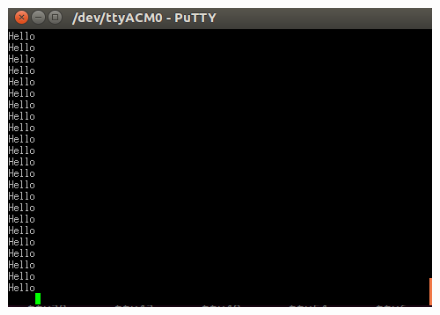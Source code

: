 \documentclass{article}
\begin{document}
\begin{figure}[H]
\begin{center}
\advance\leftskip-3cm
\advance\rightskip-3cm
\includegraphics[keepaspectratio=true,scale=0.5]{resultat.png}

\label{visina8}
\end{center}\end{figure}
\end{document}
